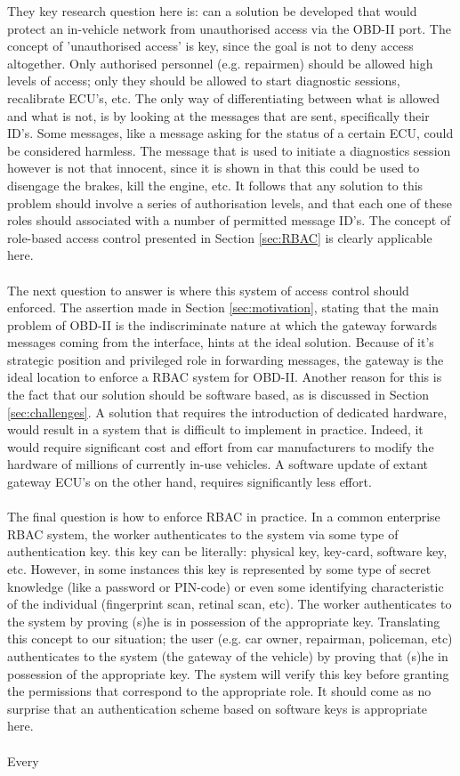 They key research question here is: can a solution be developed that would protect an in-vehicle network from unauthorised access via the OBD-II port. The concept of 'unauthorised access' is key, since the goal is not to deny access altogether. Only authorised personnel (e.g. repairmen) should be allowed high levels of access; only they should be allowed to start diagnostic sessions, recalibrate ECU's, etc. The only way of differentiating between what is allowed and what is not, is by looking at the messages that are sent, specifically their ID's. Some messages, like a message asking for the status of a certain ECU, could be considered harmless. The message that is used to initiate a diagnostics session however is not that innocent, since it is shown in \cite{MillerC} that this could be used to disengage the brakes, kill the engine, etc. It follows that any solution to this problem should involve a series of authorisation levels, and that each one of these roles should associated with a number of permitted message ID's. The concept of role-based access control presented in Section \ref{sec:RBAC} is clearly applicable here. \\ \\ The next question to answer is where this system of access control should enforced. The assertion made in Section \ref{sec:motivation}, stating that the main problem of OBD-II is the indiscriminate nature at which the gateway forwards messages coming from the interface, hints at the ideal solution. Because of it's strategic position and privileged role in forwarding messages, the gateway is the ideal location to enforce a RBAC system for OBD-II. Another reason for this is the fact that our solution should be software based, as is discussed in Section \ref{sec:challenges}. A solution that requires the introduction of dedicated hardware, would result in a system that is difficult to implement in practice. Indeed, it would require significant cost and effort from car manufacturers to modify the hardware of millions of currently in-use vehicles. A software update of extant gateway ECU's on the other hand, requires significantly less effort. \\ \\ The final question is how to enforce RBAC in practice. In a common enterprise RBAC system, the worker authenticates to the system via some type of authentication key. this key can be literally: physical key, key-card, software key, etc. However, in some instances this key is represented by some type of secret knowledge (like a password or PIN-code) or even some identifying characteristic of the individual (fingerprint scan, retinal scan, etc). The  worker authenticates to the system by proving (s)he is in possession of the appropriate key. Translating this concept to our situation; the user (e.g. car owner, repairman, policeman, etc) authenticates to the system (the gateway of the vehicle) by proving that (s)he in possession of the appropriate key. The system will verify this key before granting the permissions that correspond to the appropriate role. It should come as no surprise that an authentication scheme based on software keys is appropriate here. \\ \\ Every 
